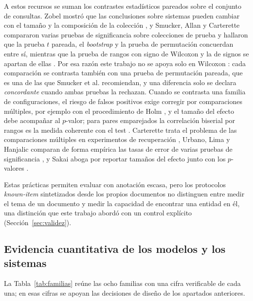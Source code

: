 \documentclass[11pt,letterpaper]{article}
\numberwithin{equation}{section}
\begin{document}
A estos recursos se suman los contrastes estadísticos pareados sobre el conjunto de consultas. Zobel mostró que las conclusiones sobre sistemas pueden cambiar con el tamaño y la composición de la colección \cite{zobel1998reliable}, y Smucker, Allan y Carterette compararon varias pruebas de significancia sobre colecciones de prueba y hallaron que la prueba $t$ pareada, el \textit{bootstrap} y la prueba de permutación concuerdan entre sí, mientras que la prueba de rangos con signo de Wilcoxon y la de signos se apartan de ellas \cite{smucker2007significance}. Por esa razón este trabajo no se apoya solo en Wilcoxon \cite{wilcoxon1945}: cada comparación se contrasta también con una prueba de permutación pareada, que es una de las que Smucker et al. recomiendan, y una diferencia solo se declara \emph{concordante} cuando ambas pruebas la rechazan. Cuando se contrasta una familia de configuraciones, el riesgo de falsos positivos exige corregir por comparaciones múltiples, por ejemplo con el procedimiento de Holm \cite{holm1979}, y el tamaño del efecto debe acompañar al $p$-valor; para pares emparejados la correlación biserial por rangos es la medida coherente con el test \cite{kerby2014}. Carterette trata el problema de las comparaciones múltiples en experimentos de recuperación \cite{carterette2012multiple}, Urbano, Lima y Hanjalic comparan de forma empírica las tasas de error de varias pruebas de significancia \cite{urbano2019significance}, y Sakai aboga por reportar tamaños del efecto junto con los $p$-valores \cite{sakai2014reform}.

Estas prácticas permiten evaluar con anotación escasa, pero los protocolos \textit{known-item} sintetizados desde los propios documentos no distinguen entre medir el tema de un documento y medir la capacidad de encontrar una entidad en él, una distinción que este trabajo abordó con un control explícito (Sección~\ref{sec:validez}).

\subsection{Evidencia cuantitativa de los modelos y los sistemas}
\label{sec:ea-cuantitativa}
La Tabla~\ref{tab:familias} reúne las ocho familias con una cifra verificable de cada una; en esas cifras se apoyan las decisiones de diseño de los apartados anteriores.
\end{document}
